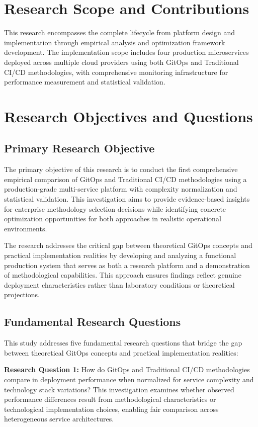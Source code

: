 \section{Research Scope and Contributions}

This research encompasses the complete lifecycle from platform design and implementation through empirical analysis and optimization framework development. The implementation scope includes four production microservices deployed across multiple cloud providers using both GitOps and Traditional CI/CD methodologies, with comprehensive monitoring infrastructure for performance measurement and statistical validation.

\section{Research Objectives and Questions}

\subsection{Primary Research Objective}
The primary objective of this research is to conduct the first comprehensive empirical comparison of GitOps and Traditional CI/CD methodologies using a production-grade multi-service platform with complexity normalization and statistical validation. This investigation aims to provide evidence-based insights for enterprise methodology selection decisions while identifying concrete optimization opportunities for both approaches in realistic operational environments.

The research addresses the critical gap between theoretical GitOps concepts and practical implementation realities by developing and analyzing a functional production system that serves as both a research platform and a demonstration of methodological capabilities. This approach ensures findings reflect genuine deployment characteristics rather than laboratory conditions or theoretical projections.

\subsection{Fundamental Research Questions}
This study addresses five fundamental research questions that bridge the gap between theoretical GitOps concepts and practical implementation realities:

\textbf{Research Question 1:} How do GitOps and Traditional CI/CD methodologies compare in deployment performance when normalized for service complexity and technology stack variations? This investigation examines whether observed performance differences result from methodological characteristics or technological implementation choices, enabling fair comparison across heterogeneous service architectures.

